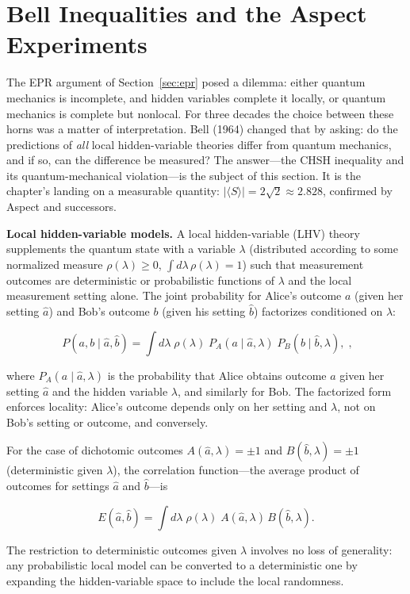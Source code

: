 \section{Bell Inequalities and the Aspect Experiments}
\label{sec:bell}

The EPR argument of Section~\ref{sec:epr} posed a dilemma: either quantum mechanics is incomplete, and hidden variables complete it locally, or quantum mechanics is complete but nonlocal. For three decades the choice between these horns was a matter of interpretation. Bell (1964) changed that by asking: do the predictions of \textit{all} local hidden-variable theories differ from quantum mechanics, and if so, can the difference be measured? The answer---the CHSH inequality and its quantum-mechanical violation---is the subject of this section. It is the chapter's landing on a measurable quantity: $\lvert\langle S\rangle\rvert = 2\sqrt{2} \approx 2.828$, confirmed by Aspect and successors.

\medskip\noindent\textbf{Local hidden-variable models.}
A local hidden-variable (LHV) theory supplements the quantum state with a variable $\lambda$ (distributed according to some normalized measure $\rho(\lambda) \ge 0$, $\int\!d\lambda\,\rho(\lambda) = 1$) such that measurement outcomes are deterministic or probabilistic functions of $\lambda$ and the local measurement setting alone. The joint probability for Alice's outcome $a$ (given her setting $\hat{a}$) and Bob's outcome $b$ (given his setting $\hat{b}$) factorizes conditioned on $\lambda$:
\begin{linenomath}
\begin{equation}
\boxed{\;
P(a,b \mid \hat{a},\hat{b})
= \int\! d\lambda\; \rho(\lambda)\;
P_A(a \mid \hat{a},\lambda)\; P_B(b \mid \hat{b},\lambda),
\;},
\label{eq:lhv-model}
\end{equation}
\end{linenomath}
where $P_A(a \mid \hat{a},\lambda)$ is the probability that Alice obtains outcome $a$ given her setting $\hat{a}$ and the hidden variable $\lambda$, and similarly for Bob. The factorized form enforces locality: Alice's outcome depends only on her setting and $\lambda$, not on Bob's setting or outcome, and conversely.

For the case of dichotomic outcomes $A(\hat{a},\lambda) = \pm 1$ and $B(\hat{b},\lambda) = \pm 1$ (deterministic given $\lambda$), the correlation function---the average product of outcomes for settings $\hat{a}$ and $\hat{b}$---is
\begin{linenomath}
\begin{equation}
E(\hat{a},\hat{b})
= \int\! d\lambda\; \rho(\lambda)\; A(\hat{a},\lambda)\,B(\hat{b},\lambda).
\label{eq:correlation-function}
\end{equation}
\end{linenomath}
The restriction to deterministic outcomes given $\lambda$ involves no loss of generality: any probabilistic local model can be converted to a deterministic one by expanding the hidden-variable space to include the local randomness.

